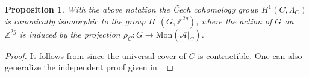 \documentclass[10 pt,a4paper]{article}
\theoremstyle{plain}
\newtheorem{prop}[thm]{Proposition}
\theoremstyle{definition}
\newtheorem{rem}[thm]{Remark}
\theoremstyle{named}
\newcommand{\cA}{\mathcal A}
\newcommand{\bZ}{\mathbb Z}
\begin{document}

\begin{prop}\label{cohoIso}
	With the above notation the Čech cohomology group $H^1(C,\Lambda_C)$ is canonically isomorphic to the group $H^1(G,\bZ^{2g})$, where the action of $G$ on $\bZ^{2g}$ is induced by the projection $\rho_C: G \rightarrow \textrm{Mon}(\cA|_C)$.
\end{prop}

\begin{proof}
It follows from \cite[Proposition 2.1.1]{Ach} since the universal cover of $C$ is contractible. One can also generalize the independent proof given in \cite[Proposition 4.1]{CZ}. 
\end{proof}
\end{document}
